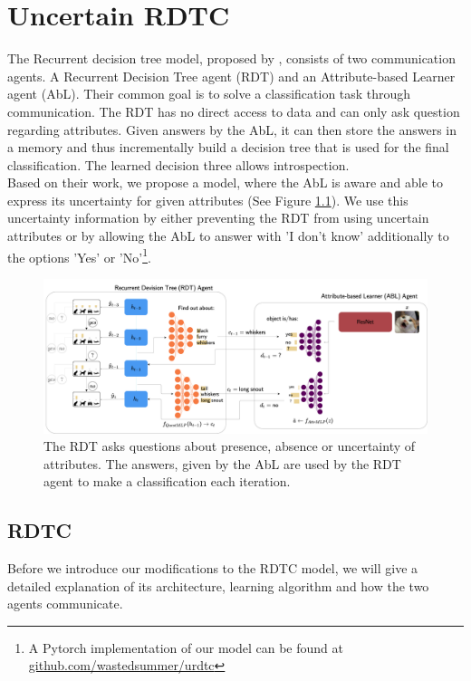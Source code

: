 \documentclass[a4paper,cleardoubleempty,BCOR1cm, 11pt]{report}
\begin{document}
\chapter{Uncertain RDTC} %
The Recurrent decision tree model, proposed by \citet{alaniz2019explainable}, consists of two communication agents. A Recurrent Decision Tree agent (RDT) and an Attribute-based Learner agent (AbL). Their common goal is to solve a classification task through communication. The RDT has no direct access to data and can only ask question regarding attributes. Given answers by the AbL, it can then store the answers in a memory and thus incrementally build a decision tree that is used for the final classification. The learned decision three allows introspection.\\
Based on their work, we propose a model, where the AbL is aware and able to express its uncertainty for given attributes (See Figure \ref{fig:uncertainRDTC}). We use this uncertainty information by either preventing the RDT from using uncertain attributes or by allowing the AbL to answer with 'I don't know' additionally to the options 'Yes' or 'No'\footnote{A Pytorch implementation of our model can be found at \url{github.com/wastedsummer/urdtc}}. 



\begin{figure}
	\centering
	\includegraphics[width=1\textwidth]{images/uncertaintRDTC.pdf} 
	\caption{The RDT asks questions about presence, absence or uncertainty of attributes. The answers, given by the AbL are used by the RDT agent to make a classification each iteration.}
	\label{fig:uncertainRDTC}
\end{figure}

\section{RDTC} 
Before we introduce our modifications to the RDTC model, we will give a detailed explanation of its architecture, learning algorithm and how the two agents communicate.
\end{document}
